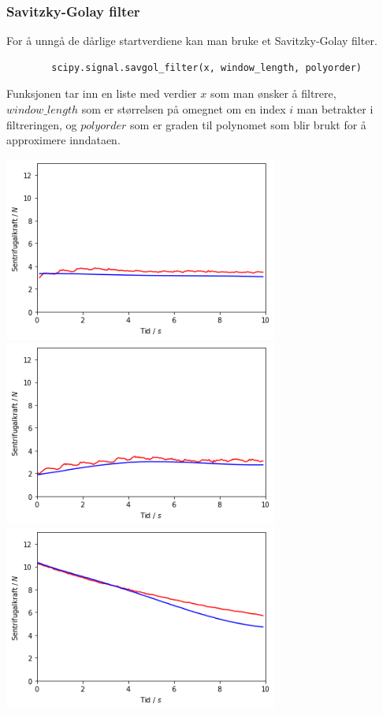 \documentclass{article}
\begin{document}
\subsubsection{Savitzky-Golay filter}
For å unngå de dårlige startverdiene kan man bruke et Savitzky-Golay filter.

\begin{Codesnippet}
    \begin{verbatim}
        scipy.signal.savgol_filter(x, window_length, polyorder)
    \end{verbatim}
\end{Codesnippet}

Funksjonen tar inn en liste med verdier $x$ som man ønsker å filtrere, $window\_length$ som er størrelsen på omegnet om en index $i$ man betrakter i filtreringen, og $polyorder$ som er 
graden til polynomet som blir brukt for å approximere inndataen.

\begin{center}
    \includegraphics[width=9cm]{data_300_10_savgol_filter.png} \\
    \includegraphics[width=9cm]{data_200_10_savgol_filter.png} \\
    \includegraphics[width=9cm]{data_300_14_savgol_filter.png}
\end{center}
\end{document}
